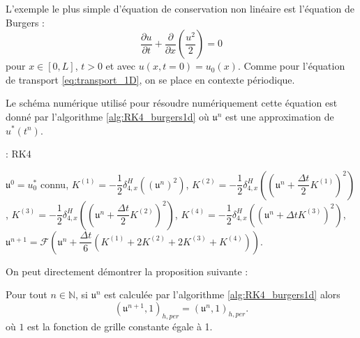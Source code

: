 L'exemple le plus simple d'équation de conservation non linéaire est l'équation de Burgers :
\begin{equation}
\dfrac{\partial u}{\partial t} + \dfrac{\partial}{\partial x} \left( \dfrac{u^2}{2}  \right) = 0
\label{eq:burgers_1D}
\end{equation}
pour $x \in [0,L]$, $t>0$ et avec $u(x,t=0)=u_0(x)$. Comme pour l'équation de transport \eqref{eq:transport_1D}, on se place en contexte périodique.

Le schéma numérique utilisé pour résoudre numériquement cette équation est donné par l'algorithme \ref{alg:RK4_burgers1d} où $\mathfrak{u}^n$ est une approximation de $u^*(t^n)$.
\begin{center}
\begin{minipage}[H]{12cm}
  \begin{algorithm}[H]
    \caption{: RK4}\label{alg:RK4_burgers1d}
    \begin{algorithmic}[1]
    \State $\mathfrak{u}^0 = u_0^*$ connu,
             \State  $K^{(1)} = - \dfrac{1}{2}\delta_{4,x}^H \left(\left( \mathfrak{u}^n \right)^2\right)$,
             \State  $K^{(2)} = - \dfrac{1}{2}\delta_{4,x}^H \left(\left( \mathfrak{u}^n + \dfrac{\Delta t}{2} K^{(1)}\right)^2\right)$,
             \State  $K^{(3)} = - \dfrac{1}{2}\delta_{4,x}^H \left(\left( \mathfrak{u}^n + \dfrac{\Delta t}{2} K^{(2)}\right)^2\right)$,
             \State  $K^{(4)} = - \dfrac{1}{2}\delta_{4,x}^H \left(\left( \mathfrak{u}^n + \Delta t K^{(3)}\right)^2\right)$,  
             \State  $\mathfrak{u}^{n+1} = \mathcal{F}\left( \mathfrak{u}^n  + \dfrac{\Delta t}{6} \left( K^{(1)} + 2 K^{(2)} + 2 K^{(3)} + K^{(4)} \right) \right)$.
            \EndFor
    \end{algorithmic}
    \end{algorithm}
\end{minipage}
\end{center}

On peut directement démontrer la proposition suivante :
\begin{proposition}
Pour tout $n \in \mathbb{N}$, si $\mathfrak{u}^n$ est calculée par l'algorithme \ref{alg:RK4_burgers1d} alors
\begin{equation}
(\mathfrak{u}^{n+1}, \mathfrak{1})_{h,per} = (\mathfrak{u}^n, \mathfrak{1})_{h,per}.
\end{equation}
où $\mathfrak{1}$ est la fonction de grille constante égale à 1.
\end{proposition}

